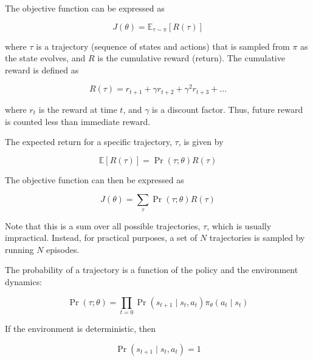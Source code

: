 \documentclass[acmlarge,screen]{acmart}
\begin{document}
The objective function can be expressed as

\begin{equation}
  J(\theta) = \mathbb{E}_{\tau \sim \pi} \left[ R(\tau) \right]
\label{eq:stochasticpolicy1}
\end{equation}

\noindent where $\tau$ is a trajectory (sequence of states and actions) that is sampled from $\pi$ as the state evolves, and
$R$ is the cumulative reward (return).  The cumulative reward is defined as

\begin{equation}
  R(\tau) = r_{t + 1} + \gamma r_{t+2} + \gamma^2 r_{t + 3} + ...
\label{eq:cumulativereward}
\end{equation}

\noindent where $r_t$ is the reward at time $t$, and $\gamma$ is a discount factor.  Thus, future reward is counted less than
immediate reward.


The expected return for a specific trajectory, $\tau$, is given by

\begin{equation}
  \mathbb{E} \left[ R(\tau) \right] = \Pr (\tau; \theta) R(\tau)
\label{eq:expectedreturn1}
\end{equation}

The objective function can then be expressed as

\begin{equation}
  J(\theta) = \sum_{\tau} \Pr (\tau; \theta) R(\tau)
\label{eq:stochasticpolicy2}
\end{equation}

\noindent Note that this is a sum over all possible trajectories, $\tau$, which is usually impractical.
Instead, for practical purposes, a set of $N$ trajectories is sampled by running $N$ episodes.

The probability of a trajectory is a function of the policy and the environment dynamics:

\begin{equation}
  \Pr (\tau; \theta) = \prod_{t=0} \Pr(s_{t+1} \mid s_t, a_t) \pi_\theta (a_t \mid s_t)
\label{eq:trajectoryprobability}
\end{equation}

\noindent If the environment is deterministic, then

\begin{equation}
  \Pr(s_{t+1} \mid s_t, a_t) = 1
\label{eq:deterministicenvironment}
\end{equation}
\end{document}
